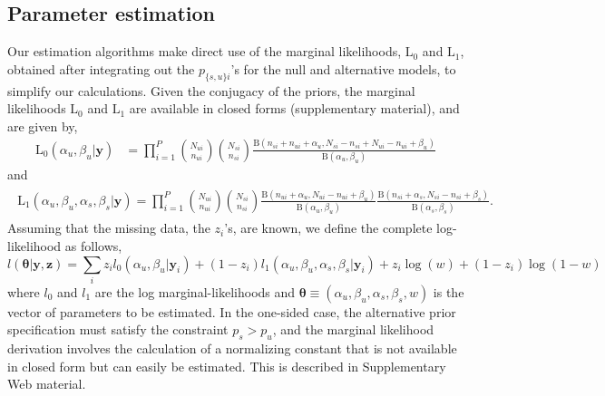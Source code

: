 \documentclass[11pt]{article}
\begin{document}
\subsection{Parameter estimation}
\label{sec:estimation}
Our estimation algorithms make direct use of the marginal likelihoods, $\mathrm{L}_0$ and $\mathrm{L}_1$, obtained after integrating out the $p_{\{s,u\}i}$'s for the null and alternative models, to simplify our calculations. Given the conjugacy of the priors, the marginal likelihoods $\mathrm{L}_0$ and $\mathrm{L}_1$ are available in closed forms (supplementary material), and are given by,
 \begin{align}
  	\mathrm{L}_0(\alpha_u,\beta_u|\mathbf{y})
	&=\prod_{i=1}^P\binom{N_{ui}}{n_{ui}}\binom{N_{si}}{n_{si}}\frac{\mathrm{B}(n_{si}+n_{ui}+\alpha_u,N_{si}-n_{si}+N_{ui}-n_{ui}+\beta_u)}{\mathrm{B}(\alpha_u,\beta_u)}\label{eq:model1post}
 \end{align} 
and
\begin{align}
	\begin{split}
\mathrm{L}_1(\alpha_u,\beta_u,\alpha_s,\beta_s|\mathbf{y}) 
=\prod_{i=1}^P\binom{N_{ui}}{n_{ui}} \binom{N_{si}}{n_{si}}\frac{\mathrm{B}(n_{ui}+\alpha_u,N_{ui}-n_{ui}+\beta_u)}{\mathrm{B}(\alpha_u,\beta_u)}\frac{\mathrm{B}(n_{si}+\alpha_s,N_{si}-n_{si}+\beta_s)}{\mathrm{B}(\alpha_s,\beta_s)}.\label{model2:unconstrained}
\end{split}
\end{align}
Assuming that the missing data, the $z_i$'s, are known, we define the complete log-likelihood as follows,
\begin{equation}
l(\boldsymbol{\theta}|\mathbf{y},\mathbf{z})=\sum_i z_i l_0(\alpha_u, \beta_u|\mathbf{y}_i) +(1-z_i) l_1(\alpha_u, \beta_u, \alpha_s, \beta_s|\mathbf{y}_i)+z_i\log(w)+(1-z_i)\log(1-w)
\label{eq:cll}
\end{equation}
where $l_0$ and $l_1$ are the log marginal-likelihoods and $\boldsymbol{\theta}\equiv(\alpha_u, \beta_u, \alpha_s,\beta_s, w)$ is the vector of parameters to be estimated. In the one-sided case, the alternative prior specification must satisfy the constraint $p_s>p_u$, and the marginal likelihood derivation involves the calculation of a normalizing constant that is not available in closed form but can easily be estimated. This is described in Supplementary Web material. 
\end{document}

